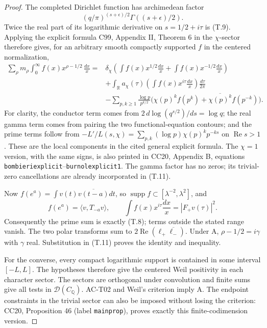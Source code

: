 \begin{proof}
The completed Dirichlet function has archimedean factor
\[
 (q/\pi)^{(s+\epsilon)/2}
       \Gamma((s+\epsilon)/2).
\]
Twice the real part of its logarithmic derivative on
\(s=1/2+i\tau\) is (T.9). Applying the explicit formula
C99, Appendix II, Theorem 6 in the \(\chi\)-sector
therefore gives, for an arbitrary smooth compactly
supported \(f\) in the centered normalization,
\[
\begin{split}
 \sum_\rho m_\rho\int_0^\infty
             f(x)x^{\rho-1/2}\,\frac{dx}{x}
={}&
 \delta_\chi\left(\int f(x)x^{1/2}\frac{dx}{x}
             +\int f(x)x^{-1/2}\frac{dx}{x}\right)\\
 &+\int_{\mathbb R}a_\chi(\tau)
           \left(\int f(x)x^{i\tau}\frac{dx}{x}\right)
                   \frac{d\tau}{2\pi}\\
 &-\sum_{p,k\geq1}\frac{\log p}{p^{k/2}}
           \bigl(\chi(p)^k f(p^k)
             +\overline{\chi(p)^k}f(p^{-k})\bigr).
\end{split}\tag{T.11}
\]
For clarity, the conductor term comes from
\(2\,d\log(q^{s/2})/ds=\log q\); the real gamma term comes
from pairing the two functional-equation contours; and
the prime terms follow from
\(-L'/L(s,\chi)=\sum_{p,k}(\log p)\chi(p)^k p^{-ks}\)
on \(\operatorname{Re}s>1\).
These are the local components in the cited general
explicit formula. The \(\chi=1\) version, with the same
signs, is also printed in CC20, Appendix B, equations
\texttt{bombieriexplicit}--\texttt{burnolexplicit1}.
The gamma factor has no zeros; its trivial-zero
cancellations are already incorporated in (T.11).

Now \(f(e^a)=\int v(t)\overline{v(t-a)}dt\), so
\(\operatorname{supp}f\subset[\lambda^{-2},\lambda^2]\),
and
\[
 f(e^a)=\langle v,T_{-a}v\rangle,\qquad
 \int f(x)x^{i\tau}\frac{dx}{x}=|F_+v(\tau)|^2 .
\]
Consequently the prime sum is exactly (T.8); terms outside
the stated range vanish. The two polar transforms sum
to \(2\operatorname{Re}(\ell_+\overline{\ell_-})\).
Under A, \(\rho-1/2=i\gamma\) with \(\gamma\) real.
Substitution in (T.11) proves the identity and inequality.

For the converse, every compact logarithmic support is
contained in some interval \([-L,L]\). The hypotheses
therefore give the centered Weil positivity in each
character sector. The sectors are orthogonal under
convolution and finite sums give all tests in
\(\mathcal D(C_{\mathbb Q})\). AC-T02 and Weil's
criterion imply A. The endpoint constraints in the
trivial sector can also be imposed without losing the
criterion: CC20, Proposition 46
(label \texttt{mainprop}), proves exactly this
finite-codimension version.
\end{proof}

